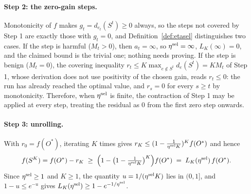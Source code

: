 \paragraph{Step 2: the zero-gain steps.}
Monotonicity of $f$ makes $g_t=d_{e_t}(S^{t})\ge0$ always, so the steps not
covered by Step 1 are exactly those with $g_t=0$, and
Definition~\ref{def:etasel} distinguishes two cases.  If the step is harmful
($M_t>0$), then $a_t=\infty$, so $\eta^{\mathrm{sel}}=\infty$, $L_K(\infty)=0$, and the
claimed bound is the trivial one; nothing needs proving.  If the step is
benign ($M_t=0$), the covering inequality
$r_t\le K\max_{e\notin S^{t}}d_e(S^{t})=KM_t$ of Step 1, whose derivation does
not use positivity of the chosen gain, reads $r_t\le0$: the run has already
reached the optimal value, and $r_s=0$ for every $s\ge t$ by monotonicity.
Therefore, when $\eta^{\mathrm{sel}}$ is finite, the contraction of Step 1 may be applied
at every step, treating the residual as $0$ from the first zero step onwards.

\paragraph{Step 3: unrolling.}
With $r_0=f(O^{\ast})$, iterating $K$ times gives
$r_K\le(1-\tfrac{1}{\eta^{\mathrm{sel}} K})^{K}f(O^{\ast})$ and hence
\[
  f(S^{K})=f(O^{\ast})-r_K
  \;\ge\;\Bigl(1-\bigl(1-\tfrac{1}{\eta^{\mathrm{sel}} K}\bigr)^{K}\Bigr)f(O^{\ast})
  \;=\;L_K(\eta^{\mathrm{sel}})\,f(O^{\ast}).
\]
Since $\eta^{\mathrm{sel}}\ge1$ and $K\ge1$, the quantity $u=1/(\eta^{\mathrm{sel}} K)$ lies in
$(0,1]$, and $1-u\le e^{-u}$ gives
$L_K(\eta^{\mathrm{sel}})\ge1-e^{-1/\eta^{\mathrm{sel}}}$.

